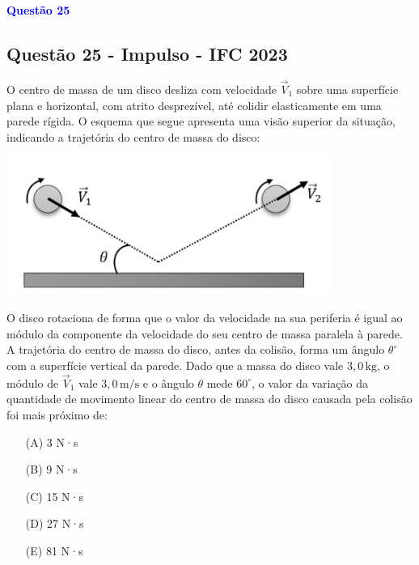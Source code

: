 \begin{flushleft}
\textbf{\textcolor{blue}{\Large Quest\~ao 25}}\\
\noindent
\subsection{Quest\~ao 25 - Impulso - IFC 2023}

O centro de massa de um disco desliza com velocidade $\vec{V}_1$ sobre uma superfície 
plana e horizontal, com atrito desprezível, até colidir elasticamente em uma parede 
rígida. O esquema que segue apresenta uma visão superior da situação, indicando a 
trajetória do centro de massa do disco:

\vspace{0.3cm}

\includegraphics[width=0.8\textwidth]{figures/colisao_impulso.png}

\vspace{0.3cm}

O disco rotaciona de forma que o valor da velocidade na sua periferia é igual ao 
módulo da componente da velocidade do seu centro de massa paralela à parede. 
A trajetória do centro de massa do disco, antes da colisão, forma um ângulo 
$\theta^\circ$ com a superfície vertical da parede. Dado que a massa do disco 
vale $3{,}0\,\mathrm{kg}$, o módulo de $\vec{V}_1$ vale $3{,}0\,\mathrm{m/s}$ e 
o ângulo $\theta$ mede $60^\circ$, o valor da variação da quantidade de movimento 
linear do centro de massa do disco causada pela colisão foi mais próximo de:

\begin{itemize}
\item[(A)] 3 N·s
\item[(B)] 9 N·s
\item[(C)] 15 N·s
\item[(D)] 27 N·s
\item[(E)] 81 N·s
\end{itemize}

\vspace{0.5cm}


\end{flushleft}

